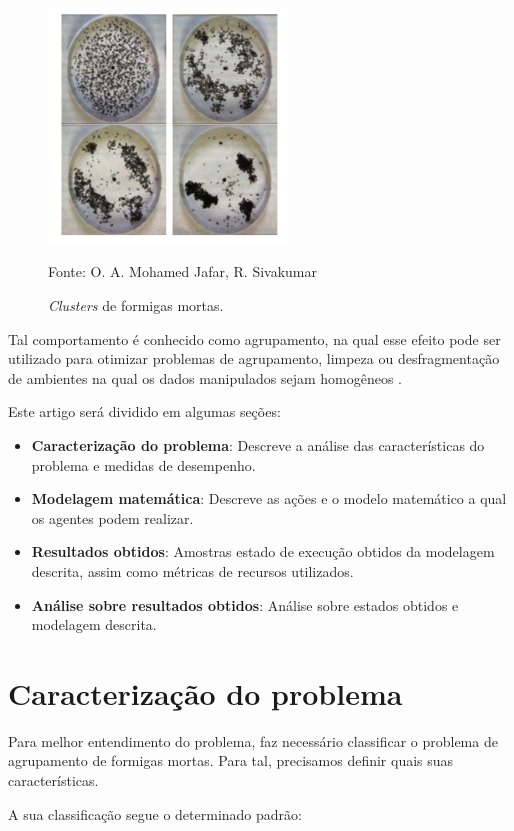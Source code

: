 \documentclass[conference]{IEEEtran}
\begin{document}
\begin{figure}[h]
\centering
\includegraphics[width=2.5in]{clusters.png}
\caption{\textit{Clusters} de formigas mortas.}
\label{fig_sim}

Fonte: O. A. Mohamed Jafar, R. Sivakumar \cite{b1}
\end{figure}

Tal comportamento é conhecido como agrupamento, na qual esse efeito pode ser utilizado para otimizar problemas de agrupamento, limpeza ou desfragmentação de ambientes na qual os dados manipulados sejam homogêneos \cite{b1}.

Este artigo será dividido em algumas seções:

\begin{itemize}
    \item \textbf{Caracterização do problema}: Descreve a análise das características do problema e medidas de desempenho.
    \item \textbf{Modelagem matemática}: Descreve as ações e o modelo matemático a qual os agentes podem realizar.
    \item \textbf{Resultados obtidos}: Amostras estado de execução obtidos da modelagem descrita, assim como métricas de recursos utilizados.
    \item \textbf{Análise sobre resultados obtidos}: Análise sobre estados obtidos e modelagem descrita.
\end{itemize}

\section{Caracterização do problema}

Para melhor entendimento do problema, faz necessário classificar o problema de agrupamento de formigas mortas. Para tal, precisamos definir quais suas características\cite{b1}.

A sua classificação segue o determinado padrão:
\end{document}
